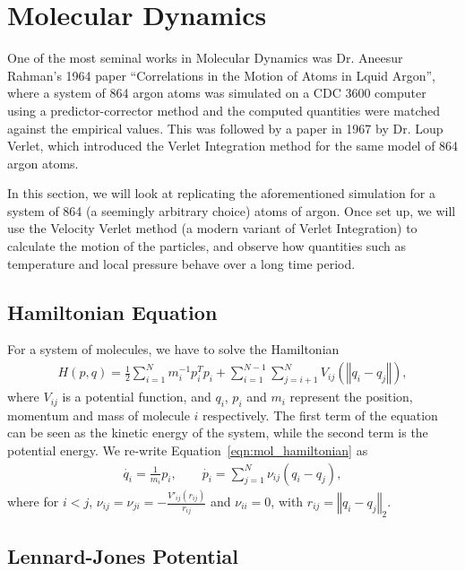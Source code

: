 \documentclass[../Main.tex]{subfiles}
\begin{document}
\section{Molecular Dynamics}

One of the most seminal works in Molecular Dynamics was Dr. Aneesur Rahman's 1964 paper \cite{Rahman1964} ``Correlations in the Motion of Atoms in Lquid Argon'', where a system of 864 argon atoms was simulated on a CDC 3600 computer using a predictor-corrector method and the computed quantities were matched against the empirical values. This was followed by a paper in 1967 \cite{Verlet1967} by Dr. Loup Verlet, which introduced the Verlet Integration method for the same model of 864 argon atoms.

In this section, we will look at replicating the aforementioned simulation for a system of 864 (a seemingly arbitrary choice) atoms of argon. Once set up, we will use the Velocity Verlet method (a modern variant of Verlet Integration) to calculate the motion of the particles, and observe how quantities such as temperature and local pressure behave over a long time period.


\subsection{Hamiltonian Equation}

For a system of molecules, we have to solve the Hamiltonian \cite{HarierLubichWanner2003}
\begin{align}
	H(p, q) = \frac{1}{2}\sum_{i = 1}^{N} m_{i}^{-1}p_{i}^{T}p_{i} + \sum_{i=1}^{N-1} \sum_{j=i+1}^{N} V_{ij}\left(\left\Vert q_{i} - q_{j} \right\Vert\right), \label{eqn:mol_hamiltonian}
\end{align} where $V_{ij}$ is a potential function, and $q_{i}$, $p_{i}$ and $m_{i}$ represent the position, momentum and mass of molecule $i$ respectively.
The first term of the equation can be seen as the kinetic energy of the system, while the second term is the potential energy. We re-write Equation~\ref{eqn:mol_hamiltonian} as
\begin{align}
	\dot{q_{i}} = \frac{1}{m_{i}}p_{i}, \quad \quad \dot{p_{i}} = \sum_{j=1}^{N}\nu_{ij}\left(q_{i} - q_{j}\right), \label{eqn:mol_hamiltonian_separate}
\end{align}where for $ i< j$, $ \nu_{ij} = \nu_{ji} = -\frac{V'_{ij}\left(r_{ij}\right)}{r_{ij}}$ and $\nu_{ii} = 0$, with $r_{ij} = \left\Vert q_{i} - q_{j} \right\Vert_{2}$.

\subsection{Lennard-Jones Potential}
\end{document}
